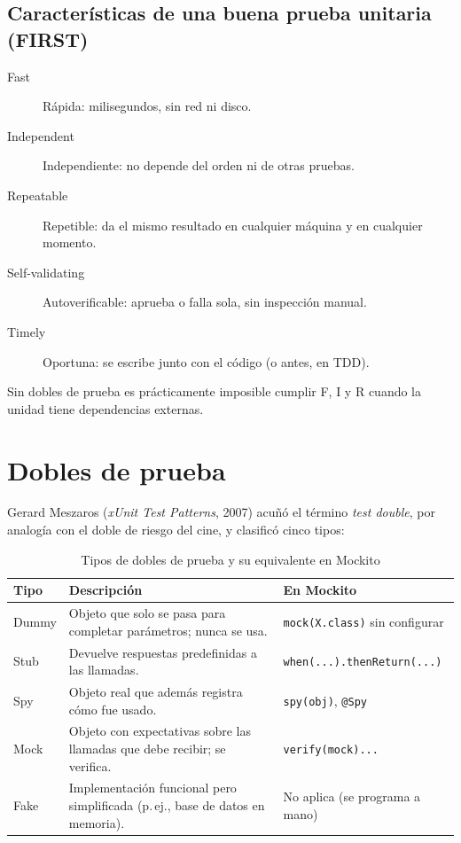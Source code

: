 \documentclass[11pt,a4paper,oneside]{report}
\newcommand{\code}[1]{\texttt{#1}}
\begin{document}
\subsection{Características de una buena prueba unitaria (FIRST)}
\begin{description}
  \item[Fast] Rápida: milisegundos, sin red ni disco.
  \item[Independent] Independiente: no depende del orden ni de otras pruebas.
  \item[Repeatable] Repetible: da el mismo resultado en cualquier máquina y en cualquier momento.
  \item[Self-validating] Autoverificable: aprueba o falla sola, sin inspección manual.
  \item[Timely] Oportuna: se escribe junto con el código (o antes, en TDD).
\end{description}
Sin dobles de prueba es prácticamente imposible cumplir F, I y R cuando la unidad tiene dependencias externas.

\section{Dobles de prueba}
Gerard Meszaros (\emph{xUnit Test Patterns}, 2007) acuñó el término \emph{test double}, por analogía con el doble de riesgo del cine, y clasificó cinco tipos:

\begin{table}[H]
\centering
\caption{Tipos de dobles de prueba y su equivalente en Mockito}
\begin{tabularx}{\linewidth}{lXl}
\toprule
\textbf{Tipo} & \textbf{Descripción} & \textbf{En Mockito}\\
\midrule
Dummy & Objeto que solo se pasa para completar parámetros; nunca se usa. & \code{mock(X.class)} sin configurar\\
Stub & Devuelve respuestas predefinidas a las llamadas. & \code{when(...).thenReturn(...)}\\
Spy & Objeto real que además registra cómo fue usado. & \code{spy(obj)}, \code{@Spy}\\
Mock & Objeto con expectativas sobre las llamadas que debe recibir; se verifica. & \code{verify(mock)...}\\
Fake & Implementación funcional pero simplificada (p.\,ej., base de datos en memoria). & No aplica (se programa a mano)\\
\bottomrule
\end{tabularx}
\end{table}
\end{document}
